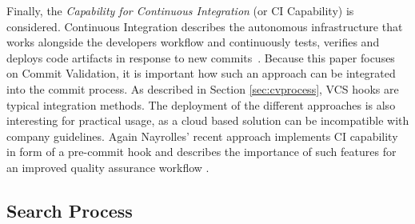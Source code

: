 Finally, the \textit{Capability for Continuous Integration} (or CI Capability) is considered. Continuous Integration describes the autonomous infrastructure that works alongside the developers workflow and continuously tests, verifies and deploys code artifacts in response to new commits~\cite{booch1991object}.
Because this paper focuses on Commit Validation, it is important how such an approach can be integrated into the commit process. As described in Section \ref{sec:cvprocess}, VCS hooks are typical integration methods. The deployment of the different approaches is also interesting for practical usage, as a cloud based solution can be incompatible with company guidelines. Again Nayrolles' recent approach implements CI capability in form of a pre-commit hook and describes the importance of such features for an improved quality assurance workflow \cite{Nayrolles2018}.


\subsection{Search Process}
\label{sec:searchprocess}

